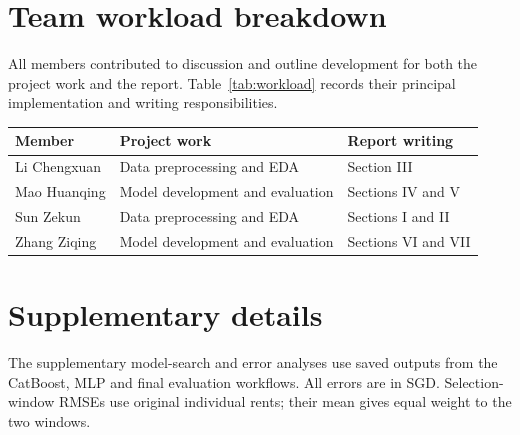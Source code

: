 \documentclass[conference]{IEEEtran}
\makeatletter
\newenvironment{localtable}{\par\addvspace{\medskipamount}\noindent
  \begin{minipage}{\columnwidth}\def\@captype{table}}{\end{minipage}\par
  \addvspace{\medskipamount}}
\makeatother
\begin{document}
\clearpage
\appendices
\section{Team workload breakdown}
\label{app:workload}
All members contributed to discussion and outline development for both the
project work and the report. Table~\ref{tab:workload} records their principal
implementation and writing responsibilities.
\begin{localtable}
  \caption{Team workload and report contributions. Student IDs appear in the author block.}
  \label{tab:workload}
  \centering\small
  \begin{tabularx}{\columnwidth}{lXX}
    \toprule
    Member & Project work & Report writing \\
    \midrule
    Li Chengxuan & Data preprocessing and EDA & Section III \\
    Mao Huanqing & Model development and evaluation & Sections IV and V \\
    Sun Zekun & Data preprocessing and EDA & Sections I and II \\
    Zhang Ziqing & Model development and evaluation & Sections VI and VII \\
    \bottomrule
  \end{tabularx}
\end{localtable}

\section{Supplementary details}
\label{app:supplement}
The supplementary model-search and error analyses use saved outputs from
the CatBoost, MLP and final evaluation workflows. All errors are in SGD. Selection-window RMSEs use
original individual rents; their mean gives equal weight to the two windows.
\end{document}
